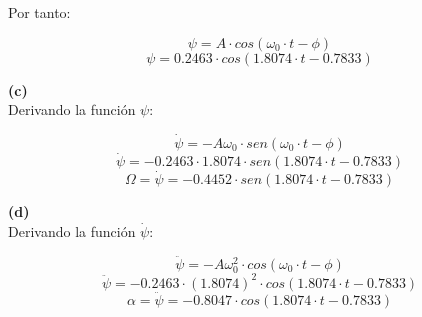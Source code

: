 \documentclass[letter,11pt]{article}
\begin{document}
Por tanto:

\begin{equation*}
    \psi = A \cdot cos(\omega_0 \cdot t - \phi)
\end{equation*}
\begin{equation}
    \psi = 0.2463 \cdot cos(1.8074 \cdot t - 0.7833)
\end{equation}

\textbf{(c)} \\

Derivando la función $\psi$:

\begin{equation*}
    \dot{\psi} = - A \omega_0 \cdot sen(\omega_0 \cdot t - \phi)
\end{equation*}
\begin{equation*}
    \dot{\psi} = - 0.2463 \cdot 1.8074 \cdot sen(1.8074 \cdot t - 0.7833)
\end{equation*}
\begin{equation}
    \Omega = \dot{\psi} = - 0.4452 \cdot sen(1.8074 \cdot t - 0.7833)
\end{equation}

\textbf{(d)} \\

Derivando la función $\dot{\psi}$:

\begin{equation*}
    \ddot{\psi} = - A \omega^2_0 \cdot cos(\omega_0 \cdot t - \phi)
\end{equation*}
\begin{equation*}
    \ddot{\psi} = - 0.2463 \cdot (1.8074)^2 \cdot cos(1.8074 \cdot t - 0.7833)
\end{equation*}
\begin{equation}
    \alpha = \ddot{\psi} = - 0.8047 \cdot cos(1.8074 \cdot t - 0.7833)
\end{equation}
\end{document}
